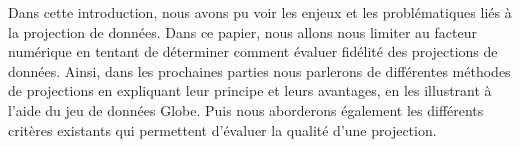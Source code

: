 Dans cette introduction, nous avons pu voir les enjeux et les problématiques liés à la projection de données.
\newline Dans ce papier, nous allons nous limiter au facteur numérique en tentant de déterminer comment évaluer fidélité des projections de données.
Ainsi, dans les prochaines parties nous parlerons de différentes méthodes de projections en expliquant leur principe et leurs avantages, en les illustrant à l’aide du jeu de données Globe\cite{colange_steering_2020}. Puis nous aborderons également les différents critères existants qui permettent d’évaluer la qualité d’une projection.










